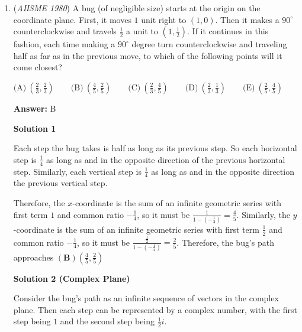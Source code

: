 \begin{enumerate}
 By the Pythagorean Theorem, $AC = \sqrt{3^2-1^2} = 2\sqrt{2}$.  So $m = 2\sqrt{2}$ and $n = \frac{2\sqrt{2}}{4} = \frac{\sqrt{2}}{2}$.  Therefore, $mn = \left(2\sqrt{2}\right)\left(\frac{\sqrt{2}}{2}\right) = \boxed{(\textbf{C}) \ 2}$.

 -j314andrews

 


	\item (\textit{AHSME 1980}) A bug (of negligible size) starts at the origin on the coordinate plane. First, it moves $1$ unit right to $(1,0)$. Then it makes a $90^\circ$ counterclockwise and travels $\frac 12$ a unit to $\left(1, \frac 12 \right)$. If it continues in this fashion, each time making a $90^\circ$ degree turn counterclockwise and traveling half as far as in the previous move, to which of the following points will it come closest? 


 $\text{(A)} \ \left(\frac 23, \frac 23 \right) \qquad \text{(B)} \ \left( \frac 45, \frac 25 \right) \qquad \text{(C)} \ \left( \frac 23, \frac 45 \right) \qquad \text{(D)} \ \left(\frac 23, \frac 13 \right) \qquad \text{(E)} \ \left(\frac 25, \frac 45 \right)$

 \textbf{Answer: }B



\textbf{Solution 1}

Each step the bug takes is half as long as its previous step.  So each horizontal step is $\frac{1}{4}$ as long as and in the opposite direction of the previous horizontal step.  Similarly, each vertical step is $\frac{1}{4}$ as long as and in the opposite direction the previous vertical step.

 Therefore, the $x$-coordinate is the sum of an infinite geometric series with first term $1$ and common ratio $-\frac{1}{4}$, so it must be $\frac{1}{1-\left(-\frac{1}{4}\right)} = \frac{4}{5}$.  Similarly, the $y$-coordinate is the sum of an infinite geometric series with first term $\frac{1}{2}$ and common ratio $-\frac{1}{4}$, so it must be $\frac{\frac{1}{2}}{1-\left(-\frac{1}{4}\right)}  = \frac{2}{5}$.  Therefore, the bug's path approaches $\boxed{(\textbf{B}) \left(\frac{4}{5}, \frac{2}{5}\right)}$




\textbf{Solution 2 (Complex Plane)}

Consider the bug's path as an infinite sequence of vectors in the complex plane.  Then each step can be represented by a complex number, with the first step being $1$ and the second step being $\frac{1}{2}i$. 


\end{enumerate}
